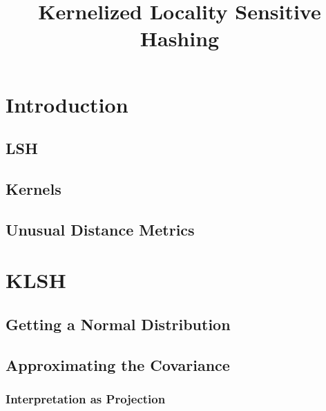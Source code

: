 \documentclass[twoside,11pt]{homework}
\title{Kernelized Locality Sensitive Hashing}
\begin{document}
\maketitle

\begin{abstract}

\lipsum[1]
  
\end{abstract}

\begin{multicols}{2}

\section{Introduction}

\subsection{LSH} %

\lipsum[2]
  
\subsection{Kernels} %

\lipsum[4]
  
\subsection{Unusual Distance Metrics} %

\lipsum[4]
  
\section{KLSH}

\lipsum[4]
  
\subsection{Getting a Normal Distribution} %

\subsection{Approximating the Covariance} %

\subsubsection{Interpretation as Projection} %


\end{multicols}
\end{document}
